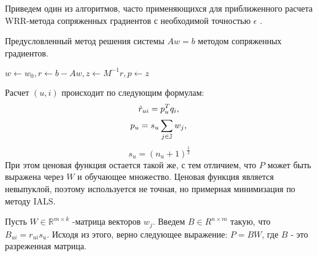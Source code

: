 \documentclass[14pt]{mmcs_article}
\begin{document}
Приведем один из алгоритмов, часто применяющихся для приближенного расчета WRR-метода сопряженных градиентов с необходимой точностью $\epsilon$ \cite{ALS:recsys}.

\begin{algorithm}[H]\label{al:1}
	\caption{Предусловленный метод решения системы $Aw = b$ методом сопряженных градиентов.}
	
	$w \leftarrow w_0, r \leftarrow b - Aw, z \leftarrow M^{-1}r, p \leftarrow z$\\
\end{algorithm}

Расчет $(u,i)$ происходит по следующим формулам:
 \begin{equation}
 	\hat{r}_{ui} = p_u^T q_i, \\ 
\end{equation}
\begin{equation}
	 p_u = s_u \sum_{j \in \mathbb{J}}w_j,\\ 
\end{equation}
\begin{equation}
	 s_u = (n_u + 1)^{\frac{1}{2}}
\end{equation} При этом ценовая функция остается такой же, с тем отличием, что $P$ может быть выражена через $W$ и обучающее множество. Ценовая функция является невыпуклой, поэтому используется не точная, но примерная минимизация по методу IALS.

Пусть $W \in \mathbb{R}^{m \times k}$ -матрица векторов $w_j$.  Введем $B \in R^{n \times m}$ такую, что $B_{ui} = r_{ui}s_u$. Исходя из этого, верно следующее выражение: $P = BW$, где $B$ - это разреженная матрица. 
\end{document}

